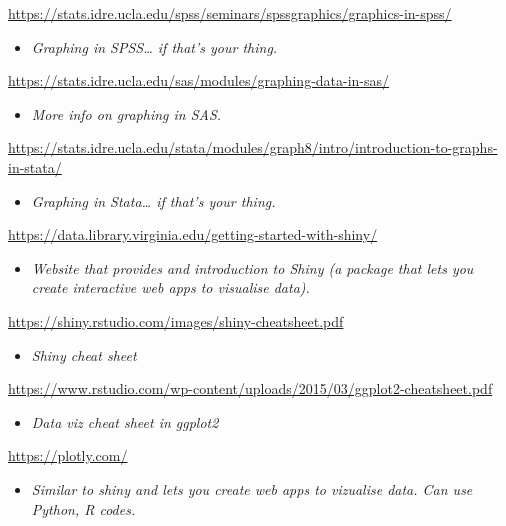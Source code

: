 \documentclass[
]{book}
\providecommand{\tightlist}{%
  \setlength{\itemsep}{0pt}\setlength{\parskip}{0pt}}
\begin{document}
\url{https://stats.idre.ucla.edu/spss/seminars/spssgraphics/graphics-in-spss/}

\begin{itemize}
\tightlist
\item
  \emph{Graphing in SPSS\ldots{} if that's your thing.}
\end{itemize}

\url{https://stats.idre.ucla.edu/sas/modules/graphing-data-in-sas/}

\begin{itemize}
\tightlist
\item
  \emph{More info on graphing in SAS.}
\end{itemize}

\url{https://stats.idre.ucla.edu/stata/modules/graph8/intro/introduction-to-graphs-in-stata/}

\begin{itemize}
\tightlist
\item
  \emph{Graphing in Stata\ldots{} if that's your thing.}
\end{itemize}

\url{https://data.library.virginia.edu/getting-started-with-shiny/}

\begin{itemize}
\tightlist
\item
  \emph{Website that provides and introduction to Shiny (a package that lets you create interactive web apps to visualise data).}
\end{itemize}

\url{https://shiny.rstudio.com/images/shiny-cheatsheet.pdf}

\begin{itemize}
\tightlist
\item
  \emph{Shiny cheat sheet}
\end{itemize}

\url{https://www.rstudio.com/wp-content/uploads/2015/03/ggplot2-cheatsheet.pdf}

\begin{itemize}
\tightlist
\item
  \emph{Data viz cheat sheet in ggplot2}
\end{itemize}

\url{https://plotly.com/}

\begin{itemize}
\tightlist
\item
  \emph{Similar to shiny and lets you create web apps to vizualise data. Can use Python, R codes.}
\end{itemize}
\end{document}
